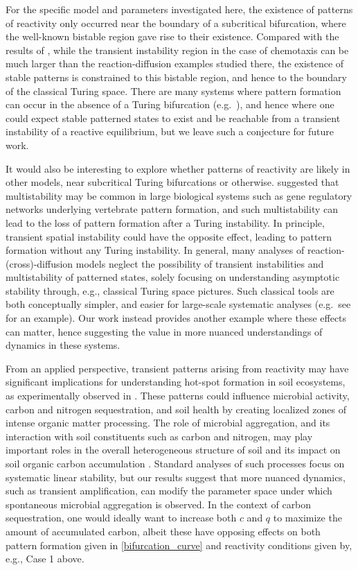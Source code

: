 \documentclass{article}
\begin{document}
{{For the specific model and parameters investigated here, the existence of patterns of reactivity only occurred near the boundary of a subcritical bifurcation, where the well-known bistable region gave rise to their existence. Compared with the results of \cite{klika2017significance}, while the transient instability region in the case of chemotaxis can be much larger than the reaction-diffusion examples studied there, the existence of stable patterns is constrained to this bistable region, and hence to the boundary of the classical Turing space.  There are many systems where pattern formation can occur in the absence of a Turing bifurcation (e.g.~\cite{brauns2020phase, al2022stationary}), and hence where one could expect stable patterned states to exist and be reachable from a transient instability of a reactive equilibrium, but we leave such a conjecture for future work.}

{It would also be interesting to explore whether patterns of reactivity are likely in other models, near subcritical Turing bifurcations or otherwise. \cite{krause2024turing} suggested that multistability may be common in large biological systems such as gene regulatory networks underlying vertebrate pattern formation, and such multistability can lead to the loss of pattern formation after a Turing instability. In principle, transient spatial instability could have the opposite effect, leading to pattern formation without any Turing instability. In general, many analyses of reaction-(cross)-diffusion models neglect the possibility of transient instabilities and multistability of patterned states, solely focusing on understanding asymptotic stability through, e.g., classical Turing space pictures. Such classical tools are both conceptually simpler, and easier for large-scale systematic analyses (e.g.~see \cite{marcon2016high} for an example). Our work instead provides another example where these effects can matter, hence suggesting the value in more nuanced understandings of  dynamics in these systems.}

From an applied perspective, transient patterns arising from reactivity may have significant implications for understanding hot-spot formation in soil ecosystems, as experimentally observed in \cite{vogel2014submicron}. These patterns could influence microbial activity, carbon and nitrogen sequestration, and soil health by creating localized zones of intense organic matter processing. {The role of microbial aggregation, and its interaction with soil constituents such as carbon and nitrogen, may play important roles in the overall heterogeneous structure of soil and its impact on soil organic carbon accumulation \cite{zhang2023soil}. Standard analyses of such processes focus on systematic linear stability, but our results suggest that more nuanced dynamics, such as transient amplification, can modify the parameter space under which spontaneous microbial aggregation is observed. In the context of carbon sequestration, one would ideally want to increase both $c$ and $q$ to maximize the amount of accumulated carbon, albeit these have opposing effects on both pattern formation given in \eqref{bifurcation_curve} and reactivity conditions given by, e.g., Case 1 above.}

}
\end{document}

